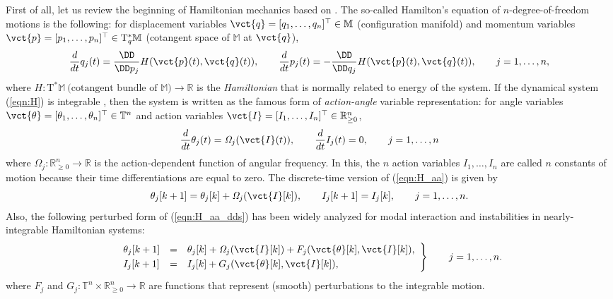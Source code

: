\documentclass[a4paper,10pt]{article}
\def\bbR{{\mathbb{R}}}
\begin{document}
First of all, let us review the beginning of Hamiltonian mechanics based on \cite{Arnold:1989}.  
The so-called Hamilton's equation of $n$-degree-of-freedom motions is the following: 
for displacement variables $\vct{q}=[q_1,\ldots,q_n]^\top\in\mathbb{M}$ (configuration manifold) and momentum variables $\vct{p}=[p_1,\ldots,p_n]^\top\in\mathrm{T}^\ast_q\mathbb{M}$ (cotangent space of $\mathbb{M}$ at $\vct{q}$),
\begin{equation}
\frac{d}{dt}q_j(t)=\frac{\DD}{\DD p_j}H(\vct{p}(t),\vct{q}(t)),\makebox[2em]{}
\frac{d}{dt}p_j(t)=-\frac{\DD}{\DD q_j}H(\vct{p}(t),\vct{q}(t)),\makebox[2em]{}j=1,\dots,n,
\label{eqn:H}
\end{equation}
where $H:\mathrm{T}^\ast\mathbb{M}~\textrm{(cotangent bundle of $\mathbb{M}$)} \to\bbR$ is the \emph{Hamiltonian} that is normally related to energy of the system.  
If the dynamical system (\ref{eqn:H}) is integrable \cite{Arnold:1989}, then the system is written as the famous form of \emph{action-angle} variable representation: for angle variables $\vct{\theta}=[\theta_1,\ldots,\theta_n]^\top\in\mathbb{T}^n$ and action variables $\vct{I}=[I_1,\ldots,I_n]^\top\in\bbR^n_{\geq 0}$, 
\begin{equation}
\frac{d}{dt}\theta_j(t)=\mathit{\Omega}_j(\vct{I}(t)),\makebox[2em]{}
\frac{d}{dt}I_j(t)=0,\makebox[2em]{}j=1,\dots,n
\label{eqn:H_aa}
\end{equation}
where $\mathit{\Omega}_j: \bbR^n_{\geq 0}\to\bbR$ is the action-dependent function of angular frequency.  
In this, the $n$ action variables $I_1,\ldots,I_n$ are called $n$ constants of motion because their time differentiations are equal to zero.  
The discrete-time version of (\ref{eqn:H_aa}) is given by
\begin{equation}
\theta_j[k+1]=\theta_j[k]+\mathit{\Omega}_j(\vct{I}[k]),\makebox[2em]{}
I_j[k+1]=I_j[k],\makebox[2em]{}j=1,\dots,n.
\label{eqn:H_aa_dds}
\end{equation}
Also, the following perturbed form of (\ref{eqn:H_aa_dds}) has been widely analyzed for modal interaction and instabilities in nearly-integrable Hamiltonian systems: 
\begin{equation}
\left.
\begin{array}{lcl}
\theta_j[k+1] &=& \theta_j[k]+\mathit{\Omega}_j(\vct{I}[k])+F_j(\vct{\theta}[k],\vct{I}[k]),\\\noalign{\vskip 1mm}
I_j[k+1] &=& I_j[k]+G_j(\vct{\theta}[k],\vct{I}[k]),
\end{array}
\right\}
\makebox[2em]{}j=1,\dots,n.
\label{eqn:H_aa_dds_p}
\end{equation}
where $F_j$ and $G_j: \mathbb{T}^n\times\bbR^n_{\geq 0}\to\bbR$ are functions that represent (smooth) perturbations to the integrable motion.  
\end{document}

